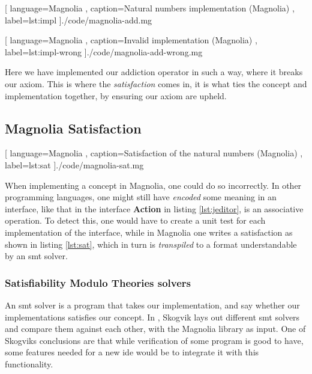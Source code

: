\begin{center}
  
    [ language=Magnolia
    , caption={Natural numbers implementation (Magnolia)}
    , label=lst:impl
    ]{./code/magnolia-add.mg}
\end{center}

\begin{center}
  
    [ language=Magnolia
    , caption={Invalid implementation (Magnolia)}
    , label=lst:impl-wrong
    ]{./code/magnolia-add-wrong.mg}
\end{center}

Here we have implemented our addiction operator in such a way, where it breaks
our axiom. This is where the \textit{satisfaction} comes in, it is what ties the
concept and implementation together, by ensuring our axiom are upheld.

\subsection{Magnolia Satisfaction}

\begin{center}
  
    [ language=Magnolia
    , caption={Satisfaction of the natural numbers (Magnolia)}
    , label=lst:sat
    ]{./code/magnolia-sat.mg}
\end{center}

When implementing a concept in Magnolia, one could do so incorrectly. In other
programming languages, one might still have \textit{encoded} some meaning in an
interface, like that in the interface \textbf{Action} in listing
\ref{lst:jeditor}, is an associative operation. To detect this, one would have
to create a unit test for each implementation of the interface, while in
Magnolia one writes a satisfaction as shown in listing \ref{lst:sat}, which in
turn is \textit{transpiled} to a format understandable by an \gls{smt} solver.

\subsubsection{Satisfiability Modulo Theories solvers}

An \gls{smt} solver is a program that takes our implementation, and say whether
our implementations satisfies our concept. In \cite{beateVerification}, Skogvik 
lays out different \gls{smt} solvers and compare them against each other, with
the Magnolia library as input. One of Skogviks conclusions are that while
verification of some program is good to have, some features needed for a new
\gls{ide} would be to integrate it with this functionality.


